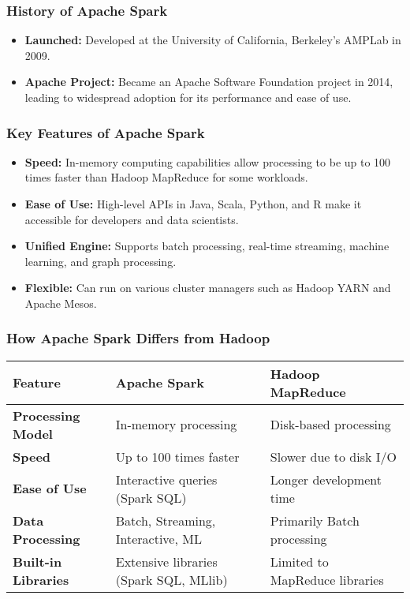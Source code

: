 \documentclass[aspectratio=169]{beamer}
\begin{document}
\begin{frame}[fragile]
    \frametitle{History of Apache Spark}
    \begin{itemize}
        \item \textbf{Launched:} Developed at the University of California, Berkeley's AMPLab in 2009.
        \item \textbf{Apache Project:} Became an Apache Software Foundation project in 2014, leading to widespread adoption for its performance and ease of use.
    \end{itemize}
\end{frame}

\begin{frame}[fragile]
    \frametitle{Key Features of Apache Spark}
    \begin{itemize}
        \item \textbf{Speed:} In-memory computing capabilities allow processing to be up to 100 times faster than Hadoop MapReduce for some workloads.
        \item \textbf{Ease of Use:} High-level APIs in Java, Scala, Python, and R make it accessible for developers and data scientists.
        \item \textbf{Unified Engine:} Supports batch processing, real-time streaming, machine learning, and graph processing.
        \item \textbf{Flexible:} Can run on various cluster managers such as Hadoop YARN and Apache Mesos.
    \end{itemize}
\end{frame}

\begin{frame}[fragile]
    \frametitle{How Apache Spark Differs from Hadoop}
    \begin{center}
        \begin{tabular}{|l|l|l|}
            \hline
            \textbf{Feature} & \textbf{Apache Spark} & \textbf{Hadoop MapReduce} \\ \hline
            \textbf{Processing Model} & In-memory processing & Disk-based processing \\ \hline
            \textbf{Speed} & Up to 100 times faster & Slower due to disk I/O \\ \hline
            \textbf{Ease of Use} & Interactive queries (Spark SQL) & Longer development time \\ \hline
            \textbf{Data Processing} & Batch, Streaming, Interactive, ML & Primarily Batch processing \\ \hline
            \textbf{Built-in Libraries} & Extensive libraries (Spark SQL, MLlib) & Limited to MapReduce libraries \\ \hline
        \end{tabular}
    \end{center}
\end{frame}
\end{document}
